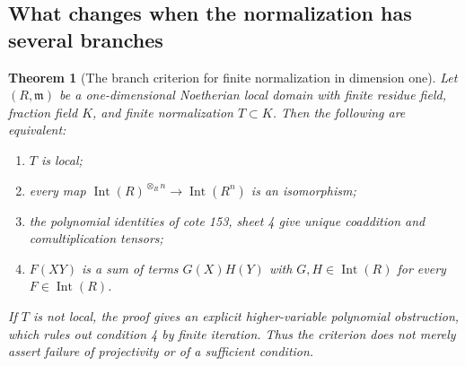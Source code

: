 \documentclass[11pt,a4paper]{article}
\newtheorem{theorem}{Theorem}[section]
\theoremstyle{definition}
\begin{document}
\subsection{What changes when the normalization has several branches}
\begin{theorem}[The branch criterion for finite normalization in dimension one]\label{result-30}
Let $(R,\mathfrak m)$ be a one-dimensional Noetherian local domain
with finite residue field, fraction field $K$, and finite
normalization $T\subset K$. Then the following are equivalent:
\begin{enumerate}
\item $T$ is local;
\item every map $\operatorname{Int}(R)^{\otimes_R n}
\to\operatorname{Int}(R^n)$ is an isomorphism;
\item the polynomial identities of cote 153, sheet 4 give unique coaddition
and comultiplication tensors;
\item $F(XY)$ is a sum of terms $G(X)H(Y)$ with
$G,H\in\operatorname{Int}(R)$ for every $F\in\operatorname{Int}(R)$.
\end{enumerate}
If $T$ is not local, the proof gives an explicit higher-variable
polynomial obstruction, which rules out condition 4 by finite
iteration. Thus the criterion does not merely assert failure of
projectivity or of a sufficient condition.
\end{theorem}
\end{document}
